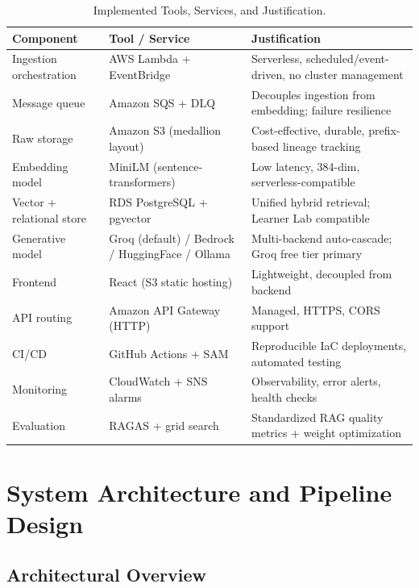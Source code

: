 \documentclass[12pt,a4paper]{report}
\begin{document}
\begin{table}[H]
\caption{Implemented Tools, Services, and Justification.}
\label{tab:tools}
\centering
\begin{tabular}{p{3.2cm}p{3.2cm}p{6.6cm}}
\toprule
\textbf{Component} & \textbf{Tool / Service} & \textbf{Justification} \\
\midrule
Ingestion orchestration & AWS Lambda + EventBridge & Serverless, scheduled/event-driven, no cluster management \\
Message queue & Amazon SQS + DLQ & Decouples ingestion from embedding; failure resilience \\
Raw storage & Amazon S3 (medallion layout) & Cost-effective, durable, prefix-based lineage tracking \\
Embedding model & MiniLM (sentence-transformers) & Low latency, 384-dim, serverless-compatible \\
Vector + relational store & RDS PostgreSQL + pgvector & Unified hybrid retrieval; Learner Lab compatible \\
Generative model & Groq (default) / Bedrock / HuggingFace / Ollama & Multi-backend auto-cascade; Groq free tier primary \\
Frontend & React (S3 static hosting) & Lightweight, decoupled from backend \\
API routing & Amazon API Gateway (HTTP) & Managed, HTTPS, CORS support \\
CI/CD & GitHub Actions + SAM & Reproducible IaC deployments, automated testing \\
Monitoring & CloudWatch + SNS alarms & Observability, error alerts, health checks \\
Evaluation & RAGAS + grid search & Standardized RAG quality metrics + weight optimization \\
\bottomrule
\end{tabular}
\end{table}

\chapter{System Architecture and Pipeline Design}

\section{Architectural Overview}
\label{sec:arch_overview}
\end{document}
